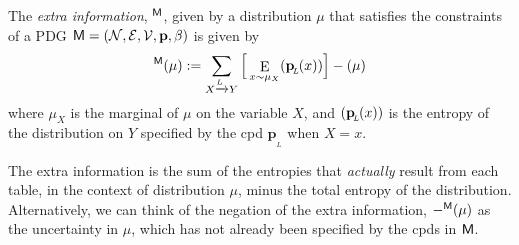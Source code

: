 \documentclass{article}
\theoremstyle{plain}
\theoremstyle{definition}
\theoremstyle{remark}
\let\H\relax
\DeclareMathOperator{\H}{\mathrm{H}} %
\DeclareMathOperator{\E}{\mathrm{E}} %
\newcommand\mat[1]{\mathbf{#1}}
\newcommand{\bp}[1][L]{\mat{p}_{\!_{#1}\!}}
\newcommand{\Ed}{\mathcal E}
\newcommand{\sfM}{\mathsf M}
\newcommand{\ed}[3]{#2 \xrightarrow{\!\!\smash{#1}\vphantom{g}} #3}
\newcommand{\alle}[1][L]{_{ \ed {#1}XY}}
\numberwithin{equation}{section}
\begin{document}
	\begin{defn}\label{def:extra}
		The \emph{extra information}, $\H^{\sfM}$, given by a distribution $\mu$ that satisfies the constraints of a PDG $\sfM = \mnvars[]$ 
		is given by
		\[ \H^{\sfM}(\mu) := \sum\alle \Big[ \E_{x
                \sim \mu_X}  \H (\bp (x))  \Big] - \H(\mu) \]  
		where $\mu_X$ is the marginal of $\mu$ on the variable
                $X$, and $\H(\bp(x))$ is the entropy of the
                distribution on $Y$ specified by the cpd $\bp$ when $X
                = x$.
	\end{defn}
	The extra information is the sum of the entropies that
        \emph{actually} result from each table, in the context of
        distribution $\mu$, minus the total entropy of the
        distribution. 
	Alternatively, we can think of the negation of the extra
        information, $-\H^\sfM(\mu)$ as the uncertainty in $\mu$,
        which has not already been specified by the cpds in $\sf M$.

\end{document}
